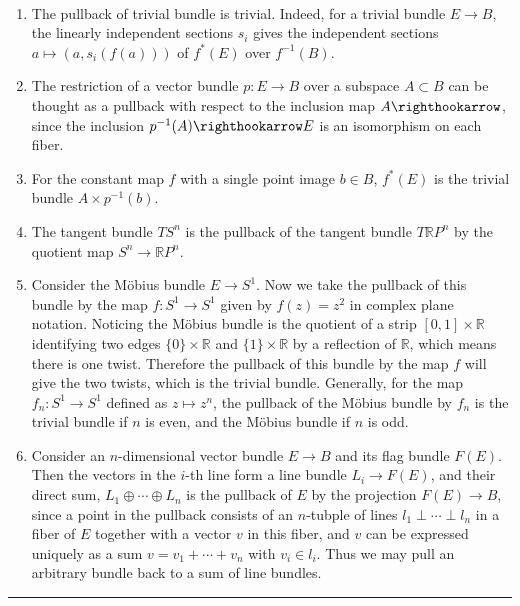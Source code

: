 \begin{exmp}
~\begin{enumerate}
\item The pullback of trivial bundle is trivial. Indeed, for a trivial bundle $E\rightarrow B$, the linearly independent sections $s_i$ gives the independent sections $a\mapsto (a,s_i(f(a)))$ of $f^*(E)$ over $f^{-1}(B)$.
\item The restriction of a vector bundle $p:E\rightarrow B$ over a subspace $A\subset B$ can be thought as a pullback with respect to the inclusion map $A\righthookarrow$, since the inclusion $p^{-1}(A)\righthookarrow E$ is an isomorphism on each fiber.
\item For the constant map $f$ with a single point image $b\in B$, $f^*(E)$ is the trivial bundle $A\times p^{-1}(b)$.
\item The tangent bundle $TS^n$ is the pullback of the tangent bundle $T\mathbb{R}P^n$ by the quotient map $S^n\rightarrow \mathbb{R}P^n$.
\item Consider the M{\"o}bius bundle $E\rightarrow S^1$. Now we take the pullback of this bundle by the map $f:S^1\rightarrow S^1$ given by $f(z)=z^2$ in complex plane notation. Noticing the M{\"o}bius bundle is the quotient of a strip $[0,1]\times \mathbb{R}$ identifying two edges $\{0\}\times \mathbb{R}$ and $\{1\}\times \mathbb{R}$ by a reflection of $\mathbb{R}$, which means there is one twist. Therefore the pullback of this bundle by the map $f$ will give the two twists, which is the trivial bundle. Generally, for the map $f_n:S^1\rightarrow S^1$ defined as $z\mapsto z^n$, the pullback of the M{\"o}bius bundle by $f_n$ is the trivial bundle if $n$ is even, and the M{\"o}bius bundle if $n$ is odd.
\item Consider an $n$-dimensional vector bundle $E\rightarrow B$ and its flag bundle $F(E)$. Then the vectors in the $i$-th line form a line bundle $L_i\rightarrow F(E)$, and their direct sum, $L_1\oplus\cdots\oplus L_n$ is the pullback of $E$ by the projection $F(E)\rightarrow B$, since a point in the pullback consists of an $n$-tubple of lines $l_1\perp \cdots \perp l_n$ in a fiber of $E$ together with a vector $v$ in this fiber, and $v$ can be expressed uniquely as a sum $v=v_1+\cdots+v_n$ with $v_i\in l_i$. Thus we may pull an arbitrary bundle back to a sum of line bundles.
\end{enumerate}
\end{exmp}
\noindent\rule{\textwidth}{1pt}
\newline